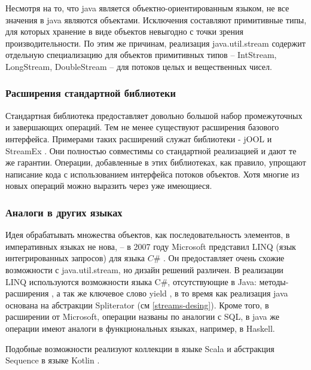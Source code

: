 Несмотря на то, что java является объектно-ориентированным языком, не все значения в java 
являются объектами. Исключения составляют примитивные типы, для которых хранение в виде 
объектов невыгодно с точки зрения производительности. По этим же причинам, реализация 
java.util.stream содержит отдельную специализацию для объектов примитивных типов -- IntStream, 
LongStream, DoubleStream -- для потоков целых и вещественных чисел. 

\subsubsection{Расширения стандартной библиотеки}
Стандартная библиотека предоставляет довольно большой набор промежуточных и завершающих операций. Тем не менее существуют расширения базового интерфейса. Примерами таких расширений служат библиотеки - jOOL \cite{java:jool} и StreamEx \cite{java:streamex}. Они полностью совместимы со стандартной реализацией и дают те же гарантии. Операции, добавленные в этих библиотеках, как правило, упрощают написание кода с использованием интерфейса потоков объектов. Хотя многие из новых операций можно выразить через уже имеющиеся.

\subsubsection{Аналоги в других языках}
Идея обрабатывать множества объектов, как последовательность элементов, в императивных языках не нова, -- в 2007 году Microsoft представил LINQ (язык интегрированных запросов) для языка $C\#$ \cite{ms:linq}. Он предоставляет очень схожие возможности с java.util.stream, но дизайн решений различен. В реализации LINQ используются возможности языка C\#, отсутствующие в Java: методы-расширения \cite{ms:ext}, а так же ключевое слово yield \cite{ms:yield}, в то время как реализация java основана на абстракции Spliterator (см \ref{streams-desing}). Кроме того, в расширении от Microsoft, операции названы по аналогии с SQL, в java же операции имеют аналоги в функциональных языках, например, в Haskell.

Подобные возможности реализуют коллекции в языке Scala \cite{ho:scala} и абстракция Sequence в языке Kotlin \cite{ho:kotlin}.
